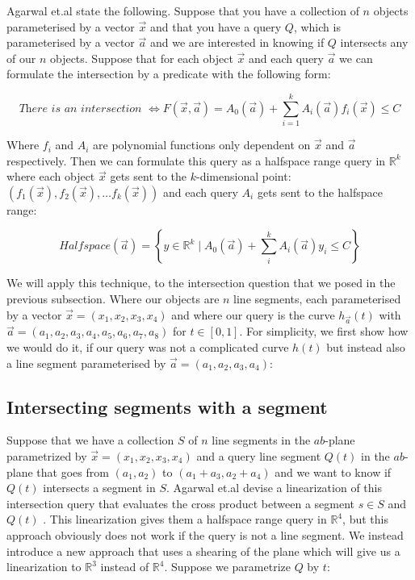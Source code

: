 \documentclass{article}
\newcommand{\etal}{et.al\xspace}
\begin{document}
Agarwal \etal state the following.
Suppose that you have a collection of $n$ objects parameterised by a vector $\vec{x}$ and that you have a query $Q$, which is parameterised by a vector $\vec{a}$ and we are interested in knowing if $Q$ intersects any of our $n$ objects.
Suppose that for each object $\vec{x}$ and each query $\vec{a}$ we can formulate the intersection by a predicate with the following form:

\begin{equation}
    \textit{There is an intersection } \iff F(\vec{x}, \vec{a}) = A_0(\vec{a}) + \sum_{i=1}^k A_i(\vec{a})f_i(\vec{x}) \le C
\end{equation}

Where $f_i$ and $A_i$ are polynomial functions only dependent on $
\vec{x}$ and $\vec{a}$ respectively. Then we can formulate this query as a halfspace range query in $\mathbb{R}^k$ where each object $\vec{x}$ gets sent to the $k$-dimensional point: $(f_1(\vec{x}), f_2(\vec{x}), \dots f_k(\vec{x}))$ and each query $A_i$ gets sent to the halfspace range:

\begin{equation}
    Halfspace(\vec{a}) = \left\{y \in \mathbb{R}^k \mid A_0(\vec{a})  + \sum_i^k A_i(\vec{a})y_i  \le C \right\}
\end{equation}

We will apply this technique, to the intersection question that we posed in the previous subsection. Where our objects are $n$ line segments, each parameterised by a vector $\vec{x} = (x_1, x_2, x_3, x_4)$ and where our query is the curve $h_{\vec{a}}(t)$ with $\vec{a} = (a_1, a_2, a_3, a_4, a_5, a_6, a_7, a_8)$ for $t \in [0,1]$.  For simplicity, we first show how we would do it, if our query was not a complicated curve $h(t)$ but instead also a line segment parameterised by $\vec{a} = (a_1, a_2, a_3, a_4)$:

\subsection{Intersecting segments with a segment}

Suppose that we have a collection $S$ of $n$ line segments in the $ab$-plane parametrized by $\vec{x} = (x_1, x_2, x_3, x_4)$ and a query line segment $Q(t)$ in the $ab$-plane that goes from $(a_1, a_2)$ to $(a_1 + a_3, a_2 + a_4)$ and we want to know if $Q(t)$ intersects a segment in $S$. Agarwal \etal devise a linearization of this intersection query that evaluates the cross product between a segment $s \in S$ and $Q(t)$ \cite{agarwal2013range}. This linearization gives them a halfspace range query in $\mathbb{R}^4$, but this approach obviously does not work if the query is not a line segment. We instead introduce a new approach that uses a shearing of the plane which will give us a linearization to $\mathbb{R}^3$ instead of $\mathbb{R}^4$.
Suppose we parametrize $Q$ by $t$:
\end{document}
